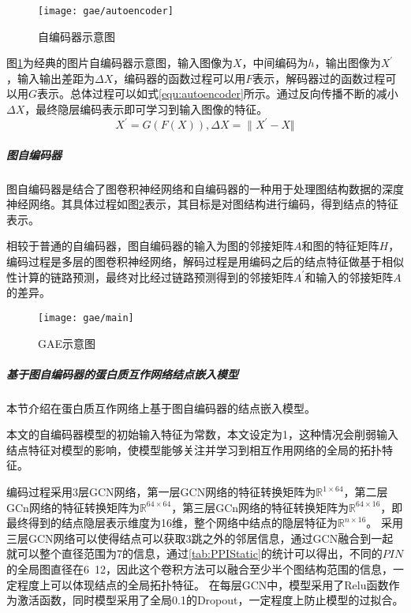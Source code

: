 \begin{figure}[htbp]
    \centering
    \texttt{[image: gae/autoencoder]}
    \caption{自编码器示意图}
    \label{fig:gae/autoencoder}
\end{figure}

图\ref{fig:gae/autoencoder}为经典的图片自编码器示意图，输入图像为$X$，中间编码为$h$，输出图像为$X^\prime $，输入输出差距为$\varDelta X$，编码器的函数过程可以用$F$表示，解码器过的函数过程可以用$G$表示。总体过程可以如式\ref{equ:autoencoder}所示。通过反向传播不断的减小$\varDelta X$，最终隐层编码表示即可学习到输入图像的特征。
\begin{equation}
    \label{equ:autoencoder}
    X^\prime =G(F(X)),
    \varDelta X={\| X^\prime - X \Vert}
\end{equation}

\subparagraph{图自编码器}

图自编码器是结合了图卷积神经网络和自编码器的一种用于处理图结构数据的深度神经网络。其具体过程如图\ref{fig:gae/main}表示，其目标是对图结构进行编码，得到结点的特征表示。

相较于普通的自编码器，图自编码器的输入为图的邻接矩阵$A$和图的特征矩阵$H$，编码过程是多层的图卷积神经网络，解码过程是用编码之后的结点特征做基于相似性计算的链路预测，最终对比经过链路预测得到的邻接矩阵$A^{\prime}$和输入的邻接矩阵$A$的差异。

\begin{figure}[htbp]
    \centering
    \texttt{[image: gae/main]}
    \caption{GAE示意图}
    \label{fig:gae/main}
\end{figure}


\subparagraph{基于图自编码器的蛋白质互作网络结点嵌入模型}

本节介绍在蛋白质互作网络上基于图自编码器的结点嵌入模型。

本文的自编码器模型的初始输入特征为常数，本文设定为1，这种情况会削弱输入结点特征对模型的影响，使模型能够关注并学习到相互作用网络的全局的拓扑特征。

编码过程采用3层GCN网络，第一层GCN网络的特征转换矩阵为$\mathbb{R} ^{1\times 64}$，第二层GCn网络的特征转换矩阵为$\mathbb{R} ^{64\times 64}$，第三层GCn网络的特征转换矩阵为$\mathbb{R} ^{64\times 16}$，即最终得到的结点隐层表示维度为16维，整个网络中结点的隐层特征为$\mathbb{R} ^{n\times 16}$。
采用三层GCN网络可以使得结点可以获取3跳之外的邻居信息，通过GCN融合到一起就可以整个直径范围为7的信息，通过\ref{tab:PPIStatic}的统计可以得出，不同的$PIN$的全局图直径在6~12，因此这个卷积方法可以融合至少半个图结构范围的信息，一定程度上可以体现结点的全局拓扑特征。
在每层GCN中，模型采用了Relu函数作为激活函数，同时模型采用了全局0.1的Dropout，一定程度上防止模型的过拟合。

